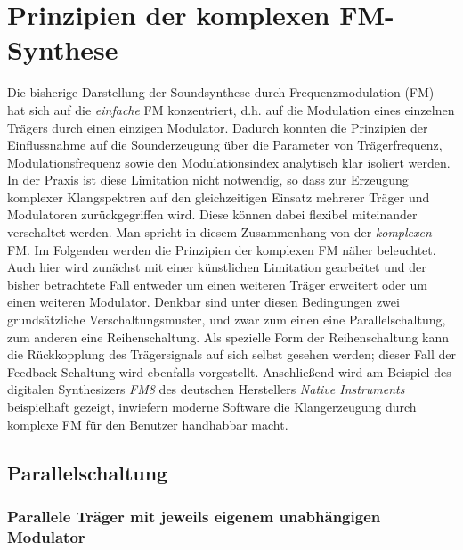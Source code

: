 \section{Prinzipien der komplexen FM-Synthese}

Die bisherige Darstellung der Soundsynthese durch Frequenzmodulation (FM) hat sich auf die \textit{einfache} FM konzentriert, d.h. auf die Modulation eines einzelnen Trägers durch einen einzigen Modulator. Dadurch konnten die Prinzipien der Einflussnahme auf die Sounderzeugung über die Parameter von Trägerfrequenz, Modulationsfrequenz sowie den Modulationsindex analytisch klar isoliert werden. In der Praxis ist diese Limitation nicht notwendig, so dass zur Erzeugung komplexer Klangspektren auf den gleichzeitigen Einsatz mehrerer Träger und Modulatoren zurückgegriffen wird. Diese können dabei flexibel miteinander verschaltet werden. Man spricht in diesem Zusammenhang von der \textit{komplexen} FM. Im Folgenden werden die Prinzipien der komplexen FM näher beleuchtet. Auch hier wird zunächst mit einer künstlichen Limitation gearbeitet und der bisher betrachtete Fall entweder um einen weiteren Träger erweitert oder um einen weiteren Modulator. Denkbar sind unter diesen Bedingungen zwei grundsätzliche Verschaltungsmuster, und zwar zum einen eine Parallelschaltung, zum anderen eine Reihenschaltung. Als spezielle Form der Reihenschaltung kann die Rückkopplung des Trägersignals auf sich selbst gesehen werden; dieser Fall der Feedback-Schaltung wird ebenfalls vorgestellt. Anschließend wird am Beispiel des digitalen Synthesizers \textit{FM8} des deutschen Herstellers \textit{Native Instruments} beispielhaft gezeigt, inwiefern moderne Software die Klangerzeugung durch komplexe FM für den Benutzer handhabbar macht. 

\subsection{Parallelschaltung}

\subsubsection{Parallele Träger mit jeweils eigenem unabhängigen Modulator}

